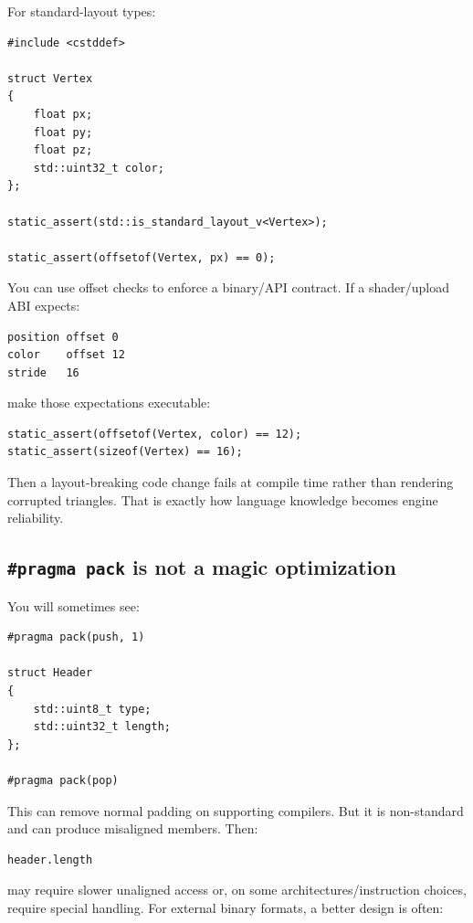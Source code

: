 For standard-layout types:

\begin{verbatim}
#include <cstddef>

struct Vertex
{
    float px;
    float py;
    float pz;
    std::uint32_t color;
};

static_assert(std::is_standard_layout_v<Vertex>);

static_assert(offsetof(Vertex, px) == 0);
\end{verbatim}

You can use offset checks to enforce a binary/API contract. If a shader/upload ABI expects:

\begin{verbatim}
position offset 0
color    offset 12
stride   16
\end{verbatim}

make those expectations executable:

\begin{verbatim}
static_assert(offsetof(Vertex, color) == 12);
static_assert(sizeof(Vertex) == 16);
\end{verbatim}

Then a layout-breaking code change fails at compile time rather than rendering corrupted triangles. That is exactly how language knowledge becomes engine reliability.

\subsection{\texorpdfstring{\texttt{\#pragma\ pack} is not a magic optimization}{\#pragma pack is not a magic optimization}}\label{05-engine-i-ch003-pragma-pack-is-not-a-magic-optimization}

You will sometimes see:

\begin{verbatim}
#pragma pack(push, 1)

struct Header
{
    std::uint8_t type;
    std::uint32_t length;
};

#pragma pack(pop)
\end{verbatim}

This can remove normal padding on supporting compilers. But it is non-standard and can produce misaligned members. Then:

\begin{verbatim}
header.length
\end{verbatim}

may require slower unaligned access or, on some architectures/instruction choices, require special handling. For external binary formats, a better design is often:

